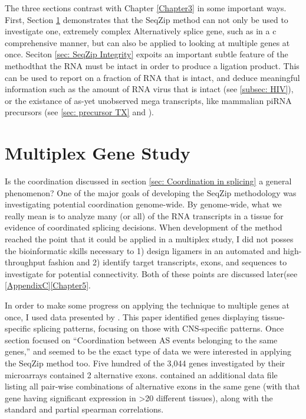   The three sections contrast with Chapter \ref{Chapter3} in some important ways. First, Section \ref{sec: Multiplex Gene Study} demonstrates that the SeqZip method can not only be used to investigate one, extremely complex Alternatively splice gene, such as \dscam{} in a c comprehensive manner, but can also be applied to looking at multiple genes at once. Seciton \ref{sec: SeqZip Integrity} expoits an important subtle feature of the method\textemdash that the RNA must be intact in order to produce a ligation product. This can be used to report on a fraction of RNA that is intact, and deduce meaningful information such as the amount of RNA virus that is intact (see \ref{subsec: HIV}), or the existance of as-yet unobserved mega transcripts, like mammalian piRNA precursors (see \ref{sec: precursor TX} and \citep{Li2013h,Li2013}).

\section{Multiplex Gene Study}\label{sec: Multiplex Gene Study}

  Is the coordination discussed in section \ref{sec: Coordination in splicing} a general phenomenon? One of the major goals of developing the SeqZip methodology was investigating potential coordination genome-wide. By genome-wide, what we really mean is to analyze many (or all) of the RNA transcripts in a tissue for evidence of coordinated splicing decisions. When development of the method reached the point that it could be applied in a multiplex study, I did not posses the bioinformatic skills necessary to 1) design ligamers in an automated and high-throughput fashion and 2) identify target transcripts, exons, and sequences to investigate for potential connectivity. Both of these points are discussed later(see \ref{AppendixC}\ref{Chapter5}. 

  In order to make some progress on applying the technique to multiple genes at once, I used data presented by \citet{Fagnani2007}. This paper identified genes displaying tissue-specific splicing patterns, focusing on those with CNS-specific patterns. Once section focused on ``Coordination between AS events belonging to the same genes,'' and seemed to be the exact type of data we were interested in applying the SeqZip method too. Five hundred of the 3,044 genes investigated by their microarrays contained 2 alternative exons. \citet{Fagnani2007} contained an additional data file listing all pair-wise combinations of alternative exons in the same gene (with that gene having significant expression in >20 different tissues), along with the standard and partial spearman correlations. 

